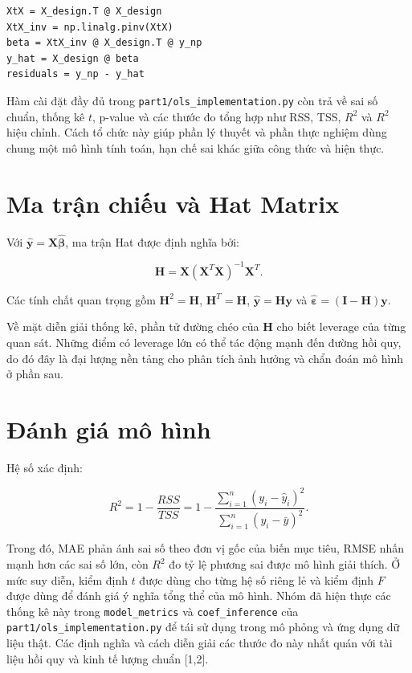 \documentclass[12pt,a4paper]{article}
\begin{document}
\begin{lstlisting}[caption={Trích đoạn tính nghiệm OLS trong \texttt{part1/ols\_implementation.py}}]
XtX = X_design.T @ X_design
XtX_inv = np.linalg.pinv(XtX)
beta = XtX_inv @ X_design.T @ y_np
y_hat = X_design @ beta
residuals = y_np - y_hat
\end{lstlisting}

Hàm cài đặt đầy đủ trong \texttt{part1/ols\_implementation.py} còn trả về sai số chuẩn, thống kê $t$, p-value và các thước đo tổng hợp như RSS, TSS, $R^2$ và $R^2$ hiệu chỉnh. Cách tổ chức này giúp phần lý thuyết và phần thực nghiệm dùng chung một mô hình tính toán, hạn chế sai khác giữa công thức và hiện thực.

\section{Ma trận chiếu và Hat Matrix}
Với $\hat{\mathbf{y}} = \mathbf{X}\hat{\boldsymbol{\beta}}$, ma trận Hat được định nghĩa bởi:
\begin{formulabox}
\begin{equation}
    \mathbf{H} = \mathbf{X}(\mathbf{X}^T\mathbf{X})^{-1}\mathbf{X}^T.
\end{equation}
\end{formulabox}
Các tính chất quan trọng gồm $\mathbf{H}^2=\mathbf{H}$, $\mathbf{H}^T=\mathbf{H}$, $\hat{\mathbf{y}}=\mathbf{H}\mathbf{y}$ và $\hat{\boldsymbol{\varepsilon}}=(\mathbf{I}-\mathbf{H})\mathbf{y}$.

Về mặt diễn giải thống kê, phần tử đường chéo của $\mathbf{H}$ cho biết leverage của từng quan sát. Những điểm có leverage lớn có thể tác động mạnh đến đường hồi quy, do đó đây là đại lượng nền tảng cho phân tích ảnh hưởng và chẩn đoán mô hình ở phần sau.

\section{Đánh giá mô hình}
Hệ số xác định:
\begin{formulabox}
\begin{equation}
    R^2 = 1 - \frac{RSS}{TSS}
        = 1 - \frac{\sum_{i=1}^{n}(y_i-\hat{y}_i)^2}{\sum_{i=1}^{n}(y_i-\bar{y})^2}.
\end{equation}
\end{formulabox}
Trong đó, MAE phản ánh sai số theo đơn vị gốc của biến mục tiêu, RMSE nhấn mạnh hơn các sai số lớn, còn $R^2$ đo tỷ lệ phương sai được mô hình giải thích. Ở mức suy diễn, kiểm định $t$ được dùng cho từng hệ số riêng lẻ và kiểm định $F$ được dùng để đánh giá ý nghĩa tổng thể của mô hình. Nhóm đã hiện thực các thống kê này trong \texttt{model\_metrics} và \texttt{coef\_inference} của \texttt{part1/ols\_implementation.py} để tái sử dụng trong mô phỏng và ứng dụng dữ liệu thật.
Các định nghĩa và cách diễn giải các thước đo này nhất quán với tài liệu hồi quy và kinh tế lượng chuẩn [1,2].
\end{document}
